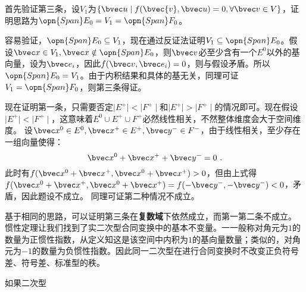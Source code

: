 首先验证第三条，设$V_1$为$\{\bvec u\mid f(\bvec{v},\bvec u)=0,\forall \bvec v\in V\}$，证明思路为$\opn{Span}E_0=V_1=\opn{Span}F_0$。

容易验证，$\opn{Span}E_0\subseteq V_1$，现在通过反证法证明$ V_1\subseteq \opn{Span}E_0$。假设$\bvec x\in V_1,\bvec x\notin \opn{Span}E_0$，则$\bvec v$必至少含有一个$E^0$以外的基向量，设为$\bvec e_i$，因此$f(\bvec v,\bvec e_i)=0$，则与假设矛盾。所以$\opn{Span}E_0=V_1$。由于内积结果和具体的基无关，同理可证$V_1=\opn{Span}F_0$，则第三条得证。

现在证明第一条，只需要否定$\mid E^{+}\mid<\mid F^{+}\mid$和$\mid E^{+}\mid>\mid F^{+}\mid$的情况即可。现在假设$\mid E^{+}\mid<\mid F^{+}\mid$，这意味着$E^0\cup E^{+} \cup F^{+}$必然线性相关，不然整体维度会大于空间维度。
设$\bvec x^0\in E^0,\bvec x^+\in E^{+},\bvec y^{-}\in F^{-}$，由于线性相关，至少存在一组向量使得：
\begin{equation}
\bvec x^0+\bvec x^{+}+\bvec y^{-}=0~.
\end{equation}
此时有$f(\bvec x^0+\bvec x^{+},\bvec x^0+\bvec x^{+})> 0$，但由上式得$f(\bvec x^0+\bvec x^{+},\bvec x^0+\bvec x^{+})=f(-\bvec y^{-},-\bvec y^{-})< 0$，矛盾，因此题设不成立。
同理可证第二种情况不成立。

基于相同的思路，可以证明第三条在\textbf{复数域}下依然成立，而第一第二条不成立。
惯性定理让我们找到了实二次型合同变换中的基本不变量。一一般称对角元为$1$的数量为正惯性指数，从定义知这是该空间中内积为$1$的基向量数量；类似的，对角元为$-1$的数量为负惯性指数。因此同一二次型在进行合同变换时不改变正负符号差、符号差、标准型的秩。

如果二次型